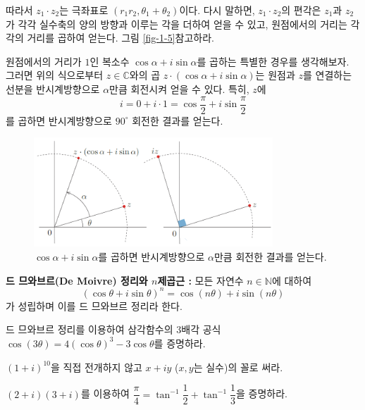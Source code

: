 따라서 $z_1\cdot z_2$는 극좌표로 $(r_1r_2, \theta_1+\theta_2)$이다.
다시 말하면, 
$z_1\cdot z_2$의 편각은
$z_1$과 $z_2$가 각각 실수축의 양의 방향과 이루는 각을 더하여 얻을 수 있고,
원점에서의 거리는 각각의 거리를 곱하여 얻는다.
그림 \ref{fig-1-5}\를 참고하라.



원점에서의 거리가 $1$인 복소수
$\cos\alpha + i \sin\alpha$를 곱하는 특별한 경우를 생각해보자.
그러면 위의 식으로부터 $z\in\mathbb C$와의 곱
$z\cdot(\cos\alpha + i\sin\alpha)$는 
원점과 $z$를 연결하는 선분을 반시계방향으로 $\alpha$만큼 회전시켜 얻을 수 있다.
특히, $z$에 
$$
i = 0 + i\cdot 1 = \cos\frac\pi2 + i \sin\frac\pi2
$$
를 곱하면 반시계방향으로 $90^{\circ}$ 회전한 결과를 얻는다.

\begin{figure}[!h]
\begin{center}
\includegraphics[width=0.8\textwidth]{./SaltChapter/figs/fig-1-6}
\end{center}
\caption{$\cos\alpha + i \sin\alpha$를 곱하면 반시계방향으로 $\alpha$만큼 회전한 결과를 얻는다.}
\label{fig-1-6}
\end{figure}

{\bf 드 므와브르(De Moivre) 정리와 $n$제곱근 :}
모든 자연수 $n\in\mathbb N$에 대하여
$$
(\cos\theta + i\sin\theta)^n = \cos(n\theta) + i\sin(n\theta)
$$
가 성립하며 이를 드 므와브르 정리라 한다.

\begin{salt_exercise} \label{ex-1-5}
드 므와브르 정리를 이용하여
삼각함수의 3배각 공식 $\cos (3\theta) = 4(\cos\theta)^3 - 3\cos\theta$를 증명하라.
\end{salt_exercise}

\begin{salt_exercise} \label{ex-1-6}
$(1+i)^{10}$을 직접 전개하지 않고 $x+iy$ ($x,y$는 실수)의 꼴로 써라.
\end{salt_exercise}

\begin{salt_exercise} \label{ex-1-7}
$(2+i)(3+i)$를 이용하여
$\dfrac\pi4 = \tan^{-1}\dfrac12 + \tan^{-1}\dfrac13$을 증명하라.
\end{salt_exercise}

